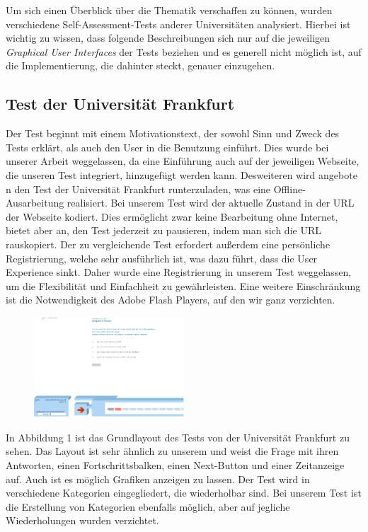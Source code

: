 \label{Jonas}
Um sich einen Überblick über die Thematik verschaffen zu können, wurden verschiedene Self-Assessment-Tests anderer Universitäten analysiert. Hierbei ist wichtig zu wissen, dass folgende Beschreibungen sich nur auf die jeweiligen \textit{Graphical User Interfaces} der Tests beziehen und es generell nicht möglich ist, auf die Implementierung, die dahinter steckt, genauer einzugehen.
\subsection{Test der Universität Frankfurt}
Der Test beginnt mit einem Motivationstext, der sowohl Sinn und Zweck des Tests erklärt, als auch den User in die Benutzung einführt. Dies wurde bei unserer Arbeit weggelassen, da eine Einführung auch auf der jeweiligen Webseite, die unseren Test integriert, hinzugefügt werden kann. Desweiteren wird angebote n den Test der Universität Frankfurt runterzuladen, was eine Offline-Ausarbeitung realisiert. Bei unserem Test wird der aktuelle Zustand in der URL der Webseite kodiert. Dies ermöglicht zwar keine Bearbeitung ohne Internet, bietet aber an, den Test jederzeit zu pausieren, indem man sich die URL rauskopiert. Der zu vergleichende Test erfordert außerdem eine persönliche Registrierung, welche sehr ausführlich ist, was dazu führt, dass die User Experience sinkt. Daher wurde eine Registrierung in unserem Test weggelassen, um die Flexibilität und Einfachheit zu gewährleisten. Eine weitere Einschränkung ist die Notwendigkeit des Adobe Flash Players, auf den wir ganz verzichten. 
\begin{figure}[htbp] 
  \centering
     \includegraphics[width=0.5\textwidth]{Jonas_Images/frankfurt1.png}
  \caption{}
  \label{fig:Bild1}
\end{figure}
In Abbildung 1 ist das Grundlayout des Tests von der Universität Frankfurt zu sehen\cite{Frankfurt}. Das Layout ist sehr ähnlich zu unserem und weist die Frage mit ihren Antworten, einen Fortschrittsbalken, einen Next-Button und einer Zeitanzeige auf. Auch ist es möglich Grafiken anzeigen zu lassen. Der Test wird in verschiedene Kategorien eingegliedert, die wiederholbar sind. Bei unserem Test ist die Erstellung von Kategorien ebenfalls möglich, aber auf jegliche Wiederholungen wurden verzichtet.
